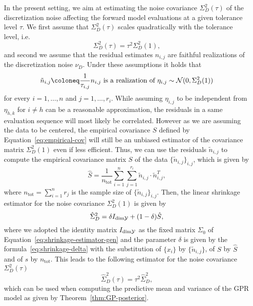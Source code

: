 In the present setting, we aim at estimating the noise covariance $\Sigma^2_D(\tau)$ of the discretization noise affecting the forward model evaluations at a given tolerance level $\tau$.
We first assume that $\Sigma^2_D(\tau)$ scales quadratically with the tolerance level, i.e. 
\[
\Sigma^2_D(\tau) = \tau^2 \Sigma^2_D(1),
\]
and second we assume that the residual estimates $n_{i,j}$ are faithful realizations of the discretization noise $\nu_D$.
Under these assumptions it holds that 
\[
\tilde n_{i,j} \coloneq \frac{1}{\tau_{i,j}} n_{i,j} \text{ is a realization of } \eta_{i,j} \sim \mc N (0, \Sigma^2_D(1))
\]
for every $ i=1,\dots,n $ and $ j=1,\dots,r_i$. \newline
While assuming $\eta_{i,j}$ to be independent from $\eta_{h,k}$ for $i\neq h$ can be a reasonable approximation, the residuals in a same evaluation sequence will most likely be correlated.
However as we are assuming the data to be centered, the empirical covariance $S$ defined by Equation~\eqref{eq:empirical-cov} will still be an unbiased estimator of the covariance matrix $\Sigma^2_D(1)$ even if less efficient.
Thus, we can use the residuals $\tilde n_{i,j}$ to compute the empirical covariance matrix $S$ of the data $\{\tilde n_{i,j}\}_{i,j}$, which is given by  
\begin{equation}
    \hat S = \frac{1}{n_{\text{tot}}} \sum_{i=1}^n\sum_{j=1}^{r_i} \tilde n_{i,j} \cdot \tilde n_{i,j}^T,
\end{equation} 
where $n_{\text{tot}} = \sum_{i=1}^n r_j $ is the sample size of $\{\tilde  n_{i,j}\}_{i,j}$. \newline
Then, the linear shrinkage estimator for the noise covariance $\Sigma^2_D(1)$ is given by
\[
    \hat \Sigma_D^2 = \delta   I_{\text{dim}\mathcal Y} + (1-\delta) \hat S,
\]
where we adopted the identity matrix $I_{\text{dim}\mathcal Y}$ as the fixed matrix $\Sigma_0$ of Equation~\eqref{eq:shrinkage-estimator-gen} and the parameter $\delta$ is given by the formula~\eqref{eq:shrinkage-delta} with the substitution of $\{x_i\}$ by $\{\tilde n_{i,j}\}$, of $S$ by $\hat S$ and of $s$ by $n_{\text{tot}}$.\newline
This leads to the following estimator for the noise covariance $\Sigma^2_D(\tau)$
\begin{equation}\label{eq:shrinkage-estimator}
    \hat{\Sigma}_D^2(\tau) = \tau^2 \hat \Sigma_D^2,
\end{equation}
which can be used when computing the predictive mean and variance of the GPR model as given by Theorem~\ref{thm:GP-posterior}.

